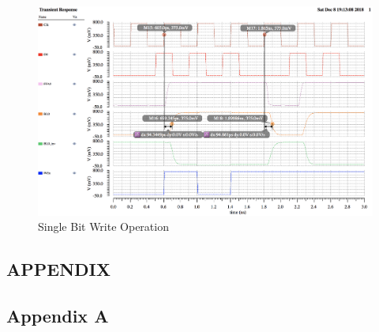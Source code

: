 \documentclass[10pt,letterpaper,onecolumn]{article}
\begin{document}
\begin{figure}[h!]
\centering
\includegraphics[clip,width=\columnwidth]{WEtoBL.png}
\caption{Single Bit Write Operation}
\label{fig:WEtoBL}
\end{figure}

\clearpage
\begin{center}
\section*{APPENDIX}
\end{center}


\subsection*{Appendix A}
\end{document}
